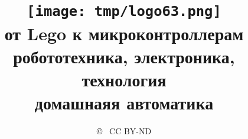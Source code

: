 

\title{\texttt{[image: tmp/logo63.png]}\\
{\Huge от Lego к микроконтроллерам}\\
робототехника, электроника, технология\\домашнаяя автоматика}

\author{ 
\copyright\  CC BY-ND
}

\newcommand{\licence}{
	\textcolor{blue}{\textbf{\copyright\ Creative Commons BY-ND, 2019}}
}





\maketitle

\def\contentsname{\empty}
\tableofcontents\secdown




























